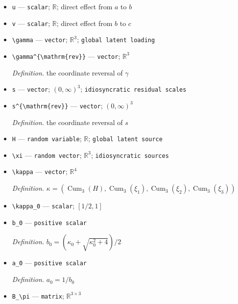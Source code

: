 \documentclass{article}
\begin{document}
\begin{itemize}
  \par\smallskip\noindent\emph{Definition.} the terminal coordinate in \(\pi=(a,b,c)\)
  \item \texttt{u} --- \texttt{scalar}; \(\mathbb R\); direct effect from \(a\) to \(b\)
  \item \texttt{v} --- \texttt{scalar}; \(\mathbb R\); direct effect from \(b\) to \(c\)
  \item \texttt{\textbackslash{}\allowbreak{}gamma} --- \texttt{vector}; \(\mathbb R^3\); \texttt{global latent loading}
  \item \texttt{\textbackslash{}\allowbreak{}gamma\textasciicircum{}\{\textbackslash{}\allowbreak{}mathrm\{rev\}\allowbreak{}\}\allowbreak{}} --- \texttt{vector}; \(\mathbb R^3\)
  \par\smallskip\noindent\emph{Definition.} the coordinate reversal of \(\gamma\)
  \item \texttt{s} --- \texttt{vector}; \((0,\infty)^3\); \texttt{idiosyncratic residual scales}
  \item \texttt{s\textasciicircum{}\{\textbackslash{}\allowbreak{}mathrm\{rev\}\allowbreak{}\}\allowbreak{}} --- \texttt{vector}; \((0,\infty)^3\)
  \par\smallskip\noindent\emph{Definition.} the coordinate reversal of \(s\)
  \item \texttt{H} --- \texttt{random variable}; \(\mathbb R\); \texttt{global latent source}
  \item \texttt{\textbackslash{}\allowbreak{}xi} --- \texttt{random vector}; \(\mathbb R^3\); \texttt{idiosyncratic sources}
  \item \texttt{\textbackslash{}\allowbreak{}kappa} --- \texttt{vector}; \(\mathbb R^4\)
  \par\smallskip\noindent\emph{Definition.} \(\kappa=(\operatorname{Cum}_3(H),\operatorname{Cum}_3(\xi_1),\operatorname{Cum}_3(\xi_2),\operatorname{Cum}_3(\xi_3))\)
  \item \texttt{\textbackslash{}\allowbreak{}kappa\_\allowbreak{}0} --- \texttt{scalar}; \([1/2,1]\)
  \item \texttt{b\_\allowbreak{}0} --- \texttt{positive scalar}
  \par\smallskip\noindent\emph{Definition.} \(b_0=(\kappa_0+\sqrt{\kappa_0^2+4})/2\)
  \item \texttt{a\_\allowbreak{}0} --- \texttt{positive scalar}
  \par\smallskip\noindent\emph{Definition.} \(a_0=1/b_0\)
  \item \texttt{B\_\allowbreak{}\textbackslash{}\allowbreak{}pi} --- \texttt{matrix}; \(\mathbb R^{3\times3}\)

\end{itemize}
\end{document}
